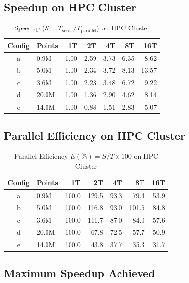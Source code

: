 \documentclass[12pt,a4paper]{article}
\begin{document}
\subsection{Speedup on HPC Cluster}

\begin{table}[H]
\centering
\caption{Speedup ($S = T_{\text{serial}} / T_{\text{parallel}}$) on HPC Cluster}
\label{tab:cluster_speedup}
\begin{tabular}{clrrrrr}
\toprule
\textbf{Config} & \textbf{Points} & \textbf{1T} & \textbf{2T} & \textbf{4T} & \textbf{8T} & \textbf{16T} \\
\midrule
a & 0.9M & 1.00 & 2.59 & 3.73 & 6.35 & 8.62 \\
b & 5.0M & 1.00 & 2.34 & 3.72 & 8.13 & 13.57 \\
c & 3.6M & 1.00 & 2.23 & 3.48 & 6.72 & 9.22 \\
d & 20.0M & 1.00 & 1.36 & 2.90 & 4.62 & 8.14 \\
e & 14.0M & 1.00 & 0.88 & 1.51 & 2.83 & 5.07 \\
\bottomrule
\end{tabular}
\end{table}

\subsection{Parallel Efficiency on HPC Cluster}

\begin{table}[H]
\centering
\caption{Parallel Efficiency $E(\%) = S/T \times 100$ on HPC Cluster}
\label{tab:cluster_efficiency}
\begin{tabular}{clrrrrr}
\toprule
\textbf{Config} & \textbf{Points} & \textbf{1T} & \textbf{2T} & \textbf{4T} & \textbf{8T} & \textbf{16T} \\
\midrule
a & 0.9M & 100.0 & 129.5 & 93.3 & 79.4 & 53.9 \\
b & 5.0M & 100.0 & 116.8 & 93.0 & 101.6 & 84.8 \\
c & 3.6M & 100.0 & 111.7 & 87.0 & 84.0 & 57.6 \\
d & 20.0M & 100.0 & 67.8 & 72.5 & 57.7 & 50.9 \\
e & 14.0M & 100.0 & 43.8 & 37.7 & 35.3 & 31.7 \\
\bottomrule
\end{tabular}
\end{table}

\subsection{Maximum Speedup Achieved}
\end{document}
